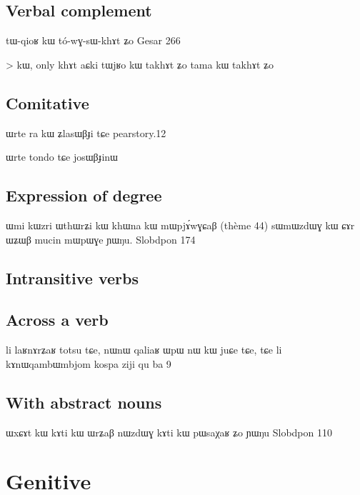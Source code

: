\documentclass[oldfontcommands,oneside,a4paper,11pt]{memoir}
\newcommand{\ipa}[1]{{\phon #1}} %
\newcommand{\jg}[1]{\ipa{#1}\index{Japhug #1}}
\begin{document}
\subsection{Verbal complement}
tɯ-qioʁ	kɯ	tó-wɣ-sɯ-khɤt	ʑo
Gesar 266

> kɯ, only \jg{khɤt}
 aɕki tɯjʁo kɯ takhɤt ʑo 
 tama kɯ takhɤt ʑo
 
\subsection{Comitative}
ɯrte ra kɯ ʑlasɯβɟi tɕe
pearstory.12

ɯrte tondo tɕe josɯβɟinɯ 


%

\subsection{Expression of degree}
ɯmi kɯzri ɯthɯrʑi kɯ khɯna kɯ mɯpjɤ́wɣɕaβ (thème 44)
sɯmɯzdɯɣ kɯ ɕɤr ɯʑɯβ mucin mɯpɯɣe ɲɯŋu. 
Slobdpon 174
\subsection{Intransitive verbs}

\subsection{Across a verb}
li laʁnɤrʑaʁ totsu tɕe, nɯnɯ qaliaʁ ɯpɯ nɯ kɯ juɕe tɕe, tɕe li kɤnɯqambɯmbjom kospa
ziji qu ba 9


\subsection{With abstract nouns}
ɯxɕɤt kɯ
kɤti kɯ
ɯrʑaβ nɯzdɯɣ kɤti kɯ pɯsaχaʁ ʑo ɲɯŋu
Slobdpon 110

\section{Genitive} \label{sec:genitive}
\end{document}

